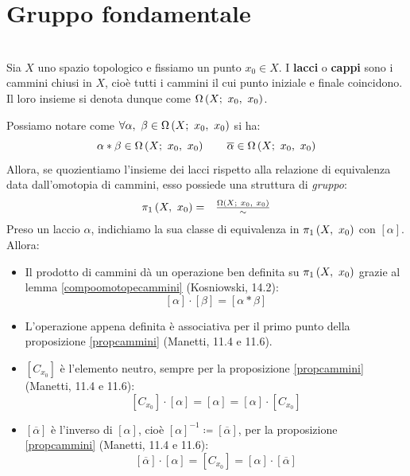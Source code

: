 \section{Gruppo fondamentale}
\begin{define}[Laccio.]~{}\\
	Sia $X$ uno spazio topologico e fissiamo un punto $x_0\in X$. I \textbf{lacci} o \textbf{cappi} sono i cammini chiusi in $X$, cioè tutti i cammini il cui punto iniziale e finale coincidono. Il loro insieme si denota dunque come $\Omega\left(X;\ x_0,\ x_0\right)$.
\end{define}
\begin{observe}
	Possiamo notare come $\forall\alpha,\ \beta\in\inscam{X}{x_0}{x_0}$ si ha:
	\begin{equation*}
		\alpha\ast\beta\in\Omega\left(X;\ x_0,\ x_0\right)\qquad \overline{\alpha}\in\Omega\left(X;\ x_0,\ x_0\right)
	\end{equation*}
Allora, se quozientiamo l'insieme dei lacci rispetto alla relazione di equivalenza data dall'omotopia di cammini, esso possiede una struttura di \textit{gruppo}:
\begin{equation}
	\begin{array}{cc}
	\gruf{X}{x_0}=&\frac{\inscam{X}{x_0}{x_0}}{\sim}
	\end{array}	
\end{equation}
Preso un laccio $\alpha$, indichiamo la sua classe di equivalenza in $\gruf{X}{x_0}$ con $\left[\alpha\right]$. Allora:
\begin{itemize}
	\item Il prodotto di cammini dà un operazione ben definita su $\gruf{X}{x_0}$ grazie al lemma \ref{compoomotopecammini} (Kosniowski, 14.2):
	\begin{equation}
		\left[\alpha\right]\cdot\left[\beta\right]=\left[\alpha\ast\beta\right]
	\end{equation}
\item L'operazione appena definita è associativa per il primo punto della proposizione \ref{propcammini} (Manetti, 11.4 e 11.6).
\item $\left[C_{x_0}\right]$ è l'elemento neutro, sempre per la proposizione \ref{propcammini} (Manetti, 11.4 e 11.6):
\begin{equation}
	\left[C_{x_0}\right]\cdot\left[\alpha\right]=\left[\alpha\right]=\left[\alpha\right]\cdot\left[C_{x_0}\right]
\end{equation}
\item $\left[\overline{\alpha}\right]$ è l'inverso di $\left[\alpha\right]$, cioè $\left[\alpha\right]^{-1}\coloneqq\left[\overline{\alpha}\right]$, per la proposizione \ref{propcammini} (Manetti, 11.4 e 11.6):
\begin{equation}
\left[\overline{\alpha}\right]\cdot\left[\alpha\right]=\left[C_{x_0}\right]=\left[\alpha\right]\cdot\left[\overline{\alpha}\right]
\end{equation}
\end{itemize}
\vspace{-6mm}
\end{observe}
